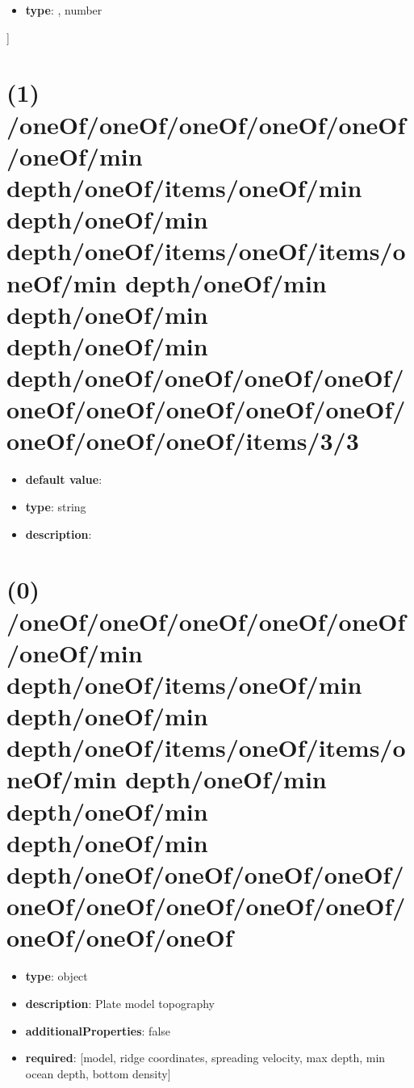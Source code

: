 \begin{itemize}[leftmargin=5em]\item {\bf type}: , number\end{itemize}]\section{(1) /oneOf/oneOf/oneOf/oneOf/oneOf/oneOf/min depth/oneOf/items/oneOf/min depth/oneOf/min depth/oneOf/items/oneOf/items/oneOf/min depth/oneOf/min depth/oneOf/min depth/oneOf/min depth/oneOf/oneOf/oneOf/oneOf/oneOf/oneOf/oneOf/oneOf/oneOf/oneOf/oneOf/oneOf/items/3/3}
\begin{itemize}[leftmargin=1em]\item {\bf default value}: 
\item {\bf type}: string
\item {\bf description}: 
\end{itemize}\section{(0) /oneOf/oneOf/oneOf/oneOf/oneOf/oneOf/min depth/oneOf/items/oneOf/min depth/oneOf/min depth/oneOf/items/oneOf/items/oneOf/min depth/oneOf/min depth/oneOf/min depth/oneOf/min depth/oneOf/oneOf/oneOf/oneOf/oneOf/oneOf/oneOf/oneOf/oneOf/oneOf/oneOf/oneOf}
\begin{itemize}[leftmargin=0em]\item {\bf type}: object
\item {\bf description}: Plate model topography
\item {\bf additionalProperties}: false
\item {\bf required}: [model, ridge coordinates, spreading velocity, max depth, min ocean depth, bottom density]\end{itemize}
